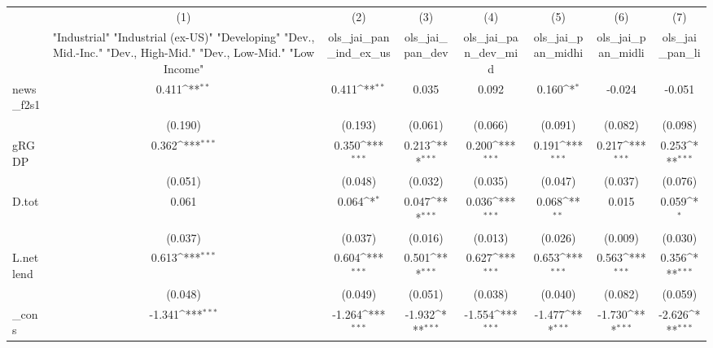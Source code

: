 {
\def\sym#1{\ifmmode^{#1}\else\(^{#1}\)\fi}
\begin{tabular}{l*{7}{c}}
\toprule
            &\multicolumn{1}{c}{(1)}&\multicolumn{1}{c}{(2)}&\multicolumn{1}{c}{(3)}&\multicolumn{1}{c}{(4)}&\multicolumn{1}{c}{(5)}&\multicolumn{1}{c}{(6)}&\multicolumn{1}{c}{(7)}\\
            &\multicolumn{1}{c}{ "Industrial" "Industrial (ex-US)" "Developing" "Dev., Mid.-Inc." "Dev., High-Mid."  "Dev., Low-Mid." "Low Income" }&\multicolumn{1}{c}{ols\_jai\_pan\_ind\_ex\_us}&\multicolumn{1}{c}{ols\_jai\_pan\_dev}&\multicolumn{1}{c}{ols\_jai\_pan\_dev\_mid}&\multicolumn{1}{c}{ols\_jai\_pan\_midhi}&\multicolumn{1}{c}{ols\_jai\_pan\_midli}&\multicolumn{1}{c}{ols\_jai\_pan\_li}\\
\midrule
news\_f2s1   &       0.411\sym{**} &       0.411\sym{**} &       0.035         &       0.092         &       0.160\sym{*}  &      -0.024         &      -0.051         \\
            &     (0.190)         &     (0.193)         &     (0.061)         &     (0.066)         &     (0.091)         &     (0.082)         &     (0.098)         \\
\addlinespace
gRGDP       &       0.362\sym{***}&       0.350\sym{***}&       0.213\sym{***}&       0.200\sym{***}&       0.191\sym{***}&       0.217\sym{***}&       0.253\sym{***}\\
            &     (0.051)         &     (0.048)         &     (0.032)         &     (0.035)         &     (0.047)         &     (0.037)         &     (0.076)         \\
\addlinespace
D.tot       &       0.061         &       0.064\sym{*}  &       0.047\sym{***}&       0.036\sym{***}&       0.068\sym{**} &       0.015         &       0.059\sym{*}  \\
            &     (0.037)         &     (0.037)         &     (0.016)         &     (0.013)         &     (0.026)         &     (0.009)         &     (0.030)         \\
\addlinespace
L.netlend   &       0.613\sym{***}&       0.604\sym{***}&       0.501\sym{***}&       0.627\sym{***}&       0.653\sym{***}&       0.563\sym{***}&       0.356\sym{***}\\
            &     (0.048)         &     (0.049)         &     (0.051)         &     (0.038)         &     (0.040)         &     (0.082)         &     (0.059)         \\
\addlinespace
\_cons      &      -1.341\sym{***}&      -1.264\sym{***}&      -1.932\sym{***}&      -1.554\sym{***}&      -1.477\sym{***}&      -1.730\sym{***}&      -2.626\sym{***}\\

\end{tabular}}
